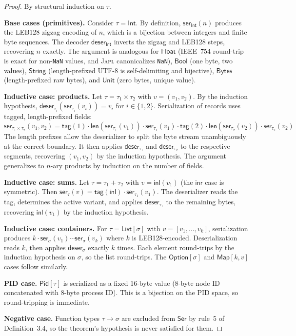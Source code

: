 \documentclass[11pt,a4paper]{article}
\newcommand{\japl}{\textsc{Japl}}
\newcommand{\Ser}{\mathsf{Ser}}
\begin{document}
\begin{proof}
By structural induction on $\tau$.

\medskip\noindent\textbf{Base cases (primitives).}
Consider $\tau = \mathsf{Int}$. By definition, $\mathsf{ser}_{\mathsf{Int}}(n)$
produces the LEB128 zigzag encoding of $n$, which is a bijection between
integers and finite byte sequences. The decoder $\mathsf{deser}_{\mathsf{Int}}$
inverts the zigzag and LEB128 steps, recovering $n$ exactly. The argument is
analogous for $\mathsf{Float}$ (IEEE~754 round-trip is exact for non-\texttt{NaN}
values, and \japl{} canonicalizes \texttt{NaN}), $\mathsf{Bool}$ (one byte, two
values), $\mathsf{String}$ (length-prefixed UTF-8 is self-delimiting and
bijective), $\mathsf{Bytes}$ (length-prefixed raw bytes), and $\mathsf{Unit}$
(zero bytes, unique value).

\medskip\noindent\textbf{Inductive case: products.}
Let $\tau = \tau_1 \times \tau_2$ with $v = (v_1, v_2)$.
By the induction hypothesis, $\mathsf{deser}_{\tau_i}(\mathsf{ser}_{\tau_i}(v_i)) = v_i$
for $i \in \{1,2\}$. Serialization of records uses tagged, length-prefixed fields:
\[
  \mathsf{ser}_{\tau_1 \times \tau_2}(v_1, v_2) =
    \mathsf{tag}(1) \cdot \mathsf{len}(\mathsf{ser}_{\tau_1}(v_1)) \cdot \mathsf{ser}_{\tau_1}(v_1)
    \cdot
    \mathsf{tag}(2) \cdot \mathsf{len}(\mathsf{ser}_{\tau_2}(v_2)) \cdot \mathsf{ser}_{\tau_2}(v_2)
\]
The length prefixes allow the deserializer to split the byte stream unambiguously
at the correct boundary. It then applies $\mathsf{deser}_{\tau_1}$ and
$\mathsf{deser}_{\tau_2}$ to the respective segments, recovering $(v_1, v_2)$
by the induction hypothesis. The argument generalizes to $n$-ary products by
induction on the number of fields.

\medskip\noindent\textbf{Inductive case: sums.}
Let $\tau = \tau_1 + \tau_2$ with $v = \mathsf{inl}(v_1)$ (the $\mathsf{inr}$
case is symmetric). Then $\mathsf{ser}_{\tau}(v) = \mathsf{tag}(\mathsf{inl})
\cdot \mathsf{ser}_{\tau_1}(v_1)$. The deserializer reads the tag, determines
the active variant, and applies $\mathsf{deser}_{\tau_1}$ to the remaining
bytes, recovering $\mathsf{inl}(v_1)$ by the induction hypothesis.

\medskip\noindent\textbf{Inductive case: containers.}
For $\tau = \mathsf{List}[\sigma]$ with $v = [v_1, \ldots, v_k]$,
serialization produces $k \cdot \mathsf{ser}_\sigma(v_1) \cdots
\mathsf{ser}_\sigma(v_k)$ where $k$ is LEB128-encoded.
Deserialization reads $k$, then applies $\mathsf{deser}_\sigma$ exactly $k$
times. Each element round-trips by the induction hypothesis on $\sigma$, so
the list round-trips. The $\mathsf{Option}[\sigma]$ and
$\mathsf{Map}[k,v]$ cases follow similarly.

\medskip\noindent\textbf{PID case.}
$\mathsf{Pid}[\tau]$ is serialized as a fixed 16-byte value (8-byte node ID
concatenated with 8-byte process ID). This is a bijection on the PID space,
so round-tripping is immediate.

\medskip\noindent\textbf{Negative case.}
Function types $\tau \to \sigma$ are excluded from $\Ser$ by rule~5 of
Definition~3.4, so the theorem's hypothesis is never satisfied for them.
\end{proof}
\end{document}
